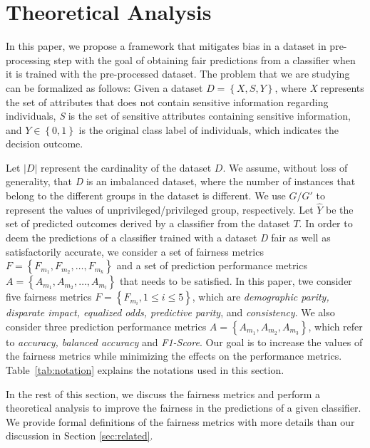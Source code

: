 
\section{Theoretical Analysis}
\label{sec:theory}

In this paper, we propose a framework that mitigates bias in a dataset in pre-processing step with the goal of obtaining fair predictions from a classifier when it is trained with the pre-processed dataset. 
The problem that we are studying can be formalized as follows: Given a dataset $D = \left\{ X, S, Y \right\}$, where \emph{X} represents the set of attributes that does not contain sensitive information regarding individuals, \emph{S} is the set of sensitive attributes containing sensitive information, and $Y \in \left\{ 0,1 \right\}$ is the original class label of individuals, which indicates the decision outcome. 

Let $|D|$ represent the cardinality of the dataset $D$. We assume, without loss of generality, that \emph{D} is an imbalanced dataset, where the number of instances that belong to the different groups in the dataset is different. 
We use $G/G'$ to represent the values of unprivileged/privileged group, respectively. 
Let $\widehat{Y}$ be the set of predicted outcomes derived by a classifier from the dataset $T$. In order to deem the predictions of a classifier trained with a dataset \emph{D} fair as well as satisfactorily accurate, we consider a set of fairness metrics $F =\left\{F_{m_{1}}, F_{m_{2}}, \dots, F_{m_{k}}  \right\}$ and a set of prediction performance metrics $A =\left\{A_{m_{1}}, A_{m_{2}}, \dots, A_{m_{l}}  \right\}$ that needs to be satisfied. In this paper, twe consider five fairness metrics $F =\left\{F_{m_{i}}, 1 \le i \le 5 \right\}$, which are \emph{demographic parity, disparate impact, equalized odds, predictive parity}, and \emph{consistency}. We also consider three prediction performance metrics $A =\left\{A_{m_{1}}, A_{m_{2}}, A_{m_{3}} \right\}$, which refer to \emph{accuracy, balanced accuracy} and \emph{F1-Score}. Our goal is to increase the values of the fairness metrics while minimizing the effects on the performance metrics. Table~\ref{tab:notation} explains the notations used in this section. 



In the rest of this section, we discuss the fairness metrics and perform a theoretical analysis to improve the fairness in the predictions of a given classifier. We provide formal definitions of the fairness metrics with more details than our discussion in Section \ref{sec:related}. 

